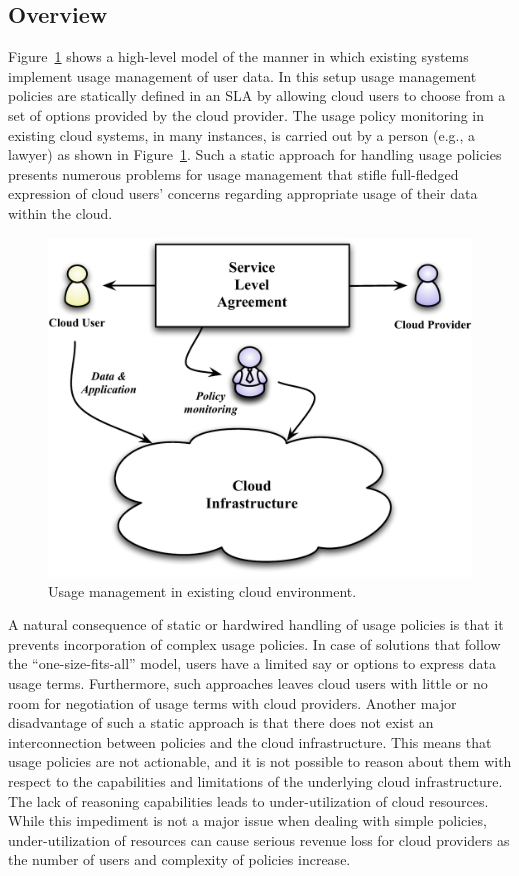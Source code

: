 \documentclass[10pt,letterpaper]{book}
\begin{document}
\subsection{Overview}
Figure~\ref{fig:overview} shows a high-level model of the manner in which existing systems implement usage management of user data. In this setup usage management policies are statically defined in an SLA by allowing cloud users to choose from a set of options provided by the cloud provider. The usage policy monitoring in existing cloud systems, in many instances, is carried out by a person (e.g., a lawyer) as shown in Figure~\ref{fig:overview}.  Such a static approach for handling usage policies presents numerous problems for usage management that stifle full-fledged expression of cloud users' concerns regarding appropriate usage of their data within the cloud.   


\begin{figure}[!t]
\centering
\includegraphics[scale=0.4]{Overview.pdf}
\caption{Usage management in existing cloud environment.}
\label{fig:overview}
\end{figure}

A natural consequence of static or hardwired handling of usage policies is that it prevents incorporation of complex usage policies. In case of solutions that follow the ``one-size-fits-all'' model, users have a limited say or options to express data usage terms. Furthermore, such approaches leaves cloud users with little or no room for negotiation of usage terms with cloud providers. Another major disadvantage of such a static approach is that there does not exist an interconnection between policies and the cloud infrastructure. This means that usage policies are not actionable, and it is not possible to reason about them with respect to the capabilities and limitations of the underlying cloud infrastructure. The lack of reasoning capabilities leads to under-utilization of cloud resources. While this impediment is not a major issue when dealing with simple policies, under-utilization of resources can cause serious revenue loss for cloud providers as the number of users and complexity of policies increase. 
\end{document}
